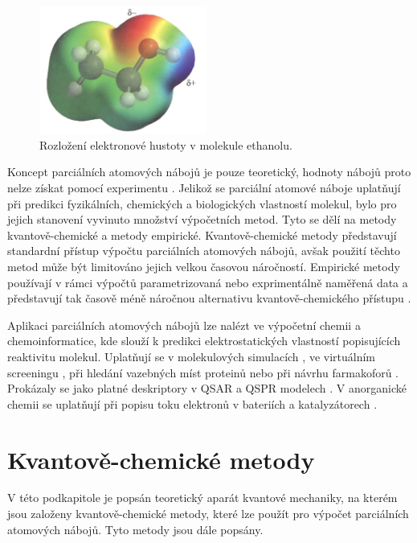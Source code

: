 \bigskip
\begin{figure}[h]
\begin{center}
\includegraphics[width=5.5cm]{pictures/partial_atomic_charges_cropped.jpg}
\caption{Rozložení elektronové hustoty v molekule ethanolu.}
\end{center}
\end{figure}
Koncept parciálních atomových nábojů je pouze teoretický, hodnoty nábojů proto nelze získat pomocí experimentu \cite{Leach}. Jelikož se parciální atomové náboje uplatňují při predikci fyzikálních, chemických a biologických vlastností molekul, bylo pro jejich stanovení vyvinuto množství výpočetních metod. Tyto se dělí na metody kvantově-chemi\-cké a metody empirické. Kvantově-chemické metody představují standardní přístup výpočtu parciálních atomových nábojů,  avšak použití těchto metod může být limitováno jejich velkou časovou náročností. Empirické metody používají v rámci výpočtů parametrizovaná nebo exprimentálně naměřená data a představují tak časově méně náročnou alternativu kvantově-chemického přístupu \cite{Gasteiger:Textbook}. 

Aplikaci parciálních atomových nábojů lze nalézt ve výpočetní chemii a chemoinformatice, kde slouží k predikci elektrostatických vlastností popisujících reaktivitu molekul. Uplatňují se v molekulových simulacích \cite{molsimul}, ve virtuálním screeningu \cite{virtscreen}, při hledání vazebných míst proteinů nebo při návrhu farmakoforů \cite{farmak}. Prokázaly se jako platné deskriptory v QSAR a QSPR modelech \cite{Ghaf:QSAR, QSPR2}. V anorganické chemii se uplatňují při popisu toku elektronů v bateriích a katalyzátorech \cite{innorg}. 

\section{Kvantově-chemické metody}
V této podkapitole je popsán teoretický aparát kvantové mechaniky, na kterém jsou založeny kvantově-chemické metody, které lze použít pro výpočet parciálních atomových nábojů. Tyto metody jsou dále popsány. 

